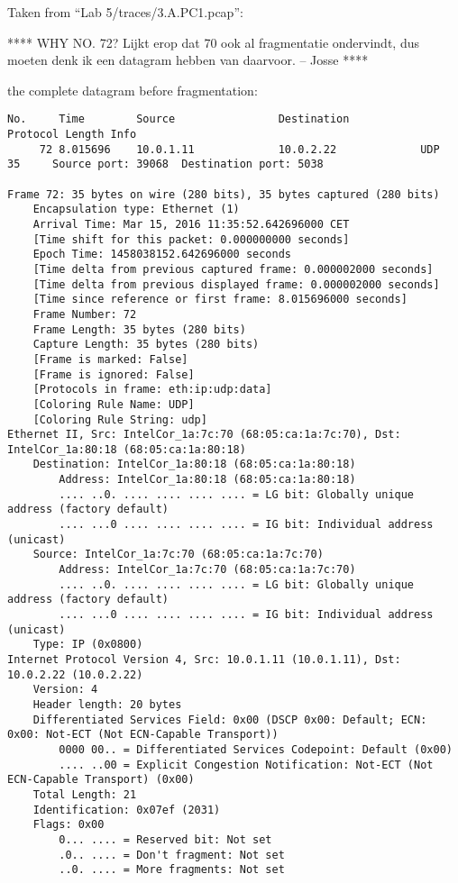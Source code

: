 Taken from ``Lab 5/traces/3.A.PC1.pcap'':

**** WHY NO. 72? Lijkt erop dat 70 ook al fragmentatie ondervindt, dus moeten denk ik een datagram hebben van daarvoor. -- Josse ****

the complete datagram before fragmentation:
\begin{lstlisting}
No.     Time        Source                Destination           Protocol Length Info
     72 8.015696    10.0.1.11             10.0.2.22             UDP      35     Source port: 39068  Destination port: 5038

Frame 72: 35 bytes on wire (280 bits), 35 bytes captured (280 bits)
    Encapsulation type: Ethernet (1)
    Arrival Time: Mar 15, 2016 11:35:52.642696000 CET
    [Time shift for this packet: 0.000000000 seconds]
    Epoch Time: 1458038152.642696000 seconds
    [Time delta from previous captured frame: 0.000002000 seconds]
    [Time delta from previous displayed frame: 0.000002000 seconds]
    [Time since reference or first frame: 8.015696000 seconds]
    Frame Number: 72
    Frame Length: 35 bytes (280 bits)
    Capture Length: 35 bytes (280 bits)
    [Frame is marked: False]
    [Frame is ignored: False]
    [Protocols in frame: eth:ip:udp:data]
    [Coloring Rule Name: UDP]
    [Coloring Rule String: udp]
Ethernet II, Src: IntelCor_1a:7c:70 (68:05:ca:1a:7c:70), Dst: IntelCor_1a:80:18 (68:05:ca:1a:80:18)
    Destination: IntelCor_1a:80:18 (68:05:ca:1a:80:18)
        Address: IntelCor_1a:80:18 (68:05:ca:1a:80:18)
        .... ..0. .... .... .... .... = LG bit: Globally unique address (factory default)
        .... ...0 .... .... .... .... = IG bit: Individual address (unicast)
    Source: IntelCor_1a:7c:70 (68:05:ca:1a:7c:70)
        Address: IntelCor_1a:7c:70 (68:05:ca:1a:7c:70)
        .... ..0. .... .... .... .... = LG bit: Globally unique address (factory default)
        .... ...0 .... .... .... .... = IG bit: Individual address (unicast)
    Type: IP (0x0800)
Internet Protocol Version 4, Src: 10.0.1.11 (10.0.1.11), Dst: 10.0.2.22 (10.0.2.22)
    Version: 4
    Header length: 20 bytes
    Differentiated Services Field: 0x00 (DSCP 0x00: Default; ECN: 0x00: Not-ECT (Not ECN-Capable Transport))
        0000 00.. = Differentiated Services Codepoint: Default (0x00)
        .... ..00 = Explicit Congestion Notification: Not-ECT (Not ECN-Capable Transport) (0x00)
    Total Length: 21
    Identification: 0x07ef (2031)
    Flags: 0x00
        0... .... = Reserved bit: Not set
        .0.. .... = Don't fragment: Not set
        ..0. .... = More fragments: Not set

\end{lstlisting}

